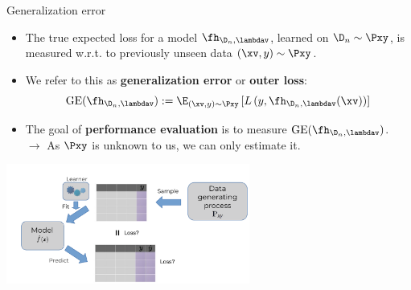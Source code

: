 \documentclass[11pt,compress,t,notes=noshow, xcolor=table]{beamer}
\begin{document}
\begin{vbframe}{Generalization error}

\begin{itemize}
  \item The true expected loss for a model $\fh_{\D_n, \lambdav}$, learned on 
  $\D_n \sim \Pxy$, is measured w.r.t. to previously 
  unseen data $(\xv, y) \sim \Pxy$.
  \item We refer to this as \textbf{generalization error} or \textbf{outer 
  loss}:
  $$\mathrm{GE}(\fh_{\D_n, \lambdav}) := \E_{(\xv, y) \sim \Pxy}\left[ 
  L\left(y, \fh_{\D_n, \lambdav}(\xv)\right) \right]$$
  \item The goal of \textbf{performance evaluation} is to measure 
  $\mathrm{GE}(\fh_{\D_n, \lambdav})$. \\
  $\rightarrow$ As $\Pxy$ is unknown to us, we can only estimate it.
\end{itemize}

\begin{center}
\includegraphics[width=0.6\textwidth]{figure_man/evaluation-intro-ge.pdf}

\end{center}

\end{vbframe}

\end{document}
